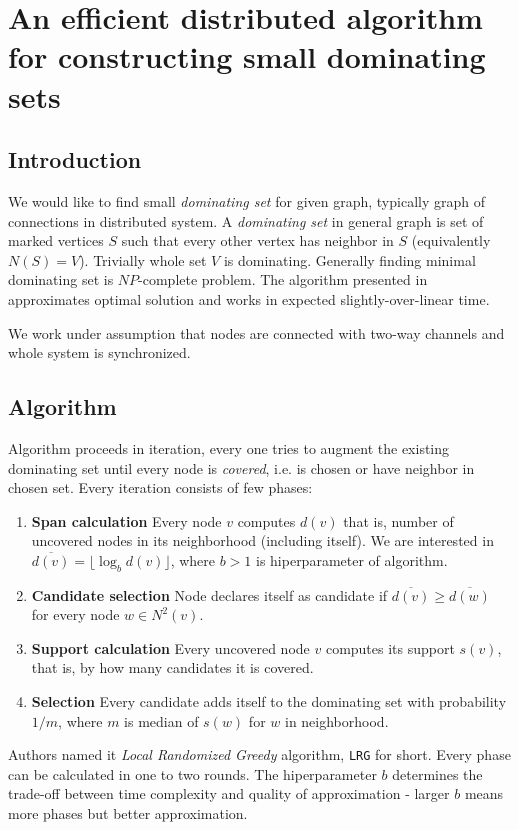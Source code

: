 \documentclass[12pt, a4paper]{article}
\begin{document}
\newtheorem{lemma}{Lemma}
\newtheorem{theorem}{Theorem}

\section*{An efficient distributed algorithm for constructing small dominating sets}
\subsection*{Introduction}
We would like to find small \textit{dominating set} for given graph, typically graph of connections in distributed system. A \textit{dominating set} in general graph is set of marked vertices $S$ such that every other vertex has neighbor in $S$ (equivalently $N(S) = V$).
Trivially whole set $V$ is dominating. Generally finding minimal dominating set is $NP$-complete problem. The algorithm presented in \cite{DS2002} approximates optimal solution and works in expected slightly-over-linear time.

We work under assumption that nodes are connected with two-way channels and whole system is synchronized.
\subsection*{Algorithm}
Algorithm proceeds in iteration, every one tries to augment the existing dominating set until every node is \textit{covered}, i.e. is chosen or have neighbor in chosen set.
Every iteration consists of few phases:
\begin{enumerate}
    \item \textbf{Span calculation} Every node $v$ computes $d(v)$ that is, number of uncovered nodes in its neighborhood (including itself). We are interested in $\overline{d(v)} = \lfloor\log_b{d(v)}\rfloor$, where $b>1$ is hiperparameter of algorithm.
    \item \textbf{Candidate selection} Node declares itself as candidate if $\overline{d(v)} \geq \overline{d(w)}$ for every node $w\in N^2(v)$.
    \item \textbf{Support calculation} Every uncovered node $v$ computes its support $s(v)$, that is, by how many candidates it is covered.
    \item \textbf{Selection} Every candidate adds itself to the dominating set with probability $1/m$, where $m$ is median of $s(w)$ for $w$ in neighborhood.
\end{enumerate}

Authors named it \textit{Local Randomized Greedy} algorithm, \texttt{LRG} for short. Every phase can be calculated in one to two rounds. The hiperparameter $b$ determines the trade-off between time complexity and quality of approximation - larger $b$ means more phases but better approximation.
\end{document}
